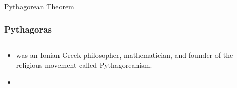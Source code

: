 \begin{omgroup}{Pythagorean Theorem}
\begin{module}[id=pythagoras]

\begin{frame}
  \frametitle{Pythagoras}
  \begin{columns}
    \begin{column}{5.8cm}
      \begin{itemize}
      \item
      \begin{definition}
         was an Ionian Greek philosopher, mathematician, and founder of the religious movement called Pythagoreanism.
      \end{definition}
       \item {}

    \end{itemize}
    \end{column}
    \begin{column}{5.5cm}
    \end{column}
  \end{columns}
\end{frame}
\end{module}
\end{omgroup}
